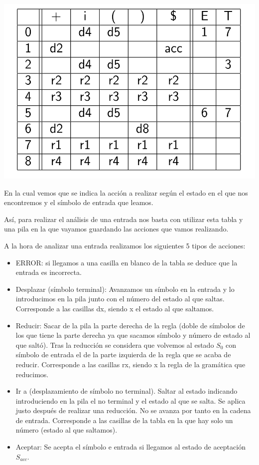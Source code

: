 \documentclass{apuntes}
\begin{document}
\begin{example}
\begin{center}
\includegraphics[scale=0.3]{img/tablaanallr0.jpg}
\end{center}

En la cual vemos que se indica la acción a realizar según el estado en el que nos encontremos y el símbolo de entrada que leamos.

Así, para realizar el análisis de una entrada nos basta con utilizar esta tabla y una pila en la que vayamos guardando las acciones que vamos realizando.

A la hora de analizar una entrada realizamos los siguientes 5 tipos de acciones:
\begin{itemize}
\item ERROR: si llegamos a una casilla en blanco de la tabla se deduce que la entrada es incorrecta.
\item Desplazar (símbolo terminal): Avanzamos un símbolo en la entrada y lo introducimos en la pila junto con el número del estado al que saltas. Corresponde a las casillas dx, siendo x el estado al que saltamos.
\item Reducir: Sacar de la pila la parte derecha de la regla (doble de símbolos de los que tiene la parte derecha ya que sacamos símbolo y número de estado al que saltó). Tras la reducción se considera que volvemos al estado $S_0$ con símbolo de entrada el de la parte izquierda de la regla que se acaba de reducir. Corresponde a las casillas rx, siendo x la regla de la gramática que reducimos.
\item Ir a (desplazamiento de símbolo no terminal). Saltar al estado indicando introduciendo en la pila el no terminal y el estado al que se salta. Se aplica justo después de realizar una reducción. No se avanza por tanto en la cadena de entrada. Corresponde a las casillas de la tabla en la que hay solo un número (estado al que saltamos). 
\item Aceptar: Se acepta el símbolo e entrada si llegamos al estado de aceptación $S_{acc}$.
\end{itemize}


\end{example}
\end{document}
